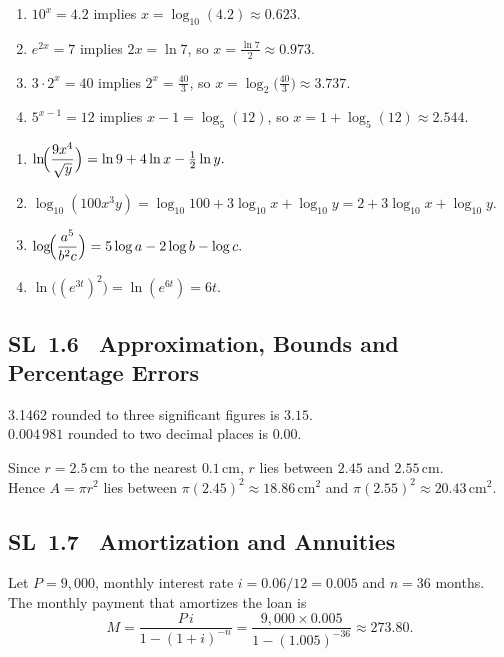 \documentclass[11pt]{article}
\newcommand{\tocsubsection}[1]{\subsection{#1}}
\begin{document}
\begin{solution}
\begin{enumerate}[label=(\alph*)]
\item $10^{x}=4.2$ implies $x=\log_{10}(4.2)\approx 0.623$.
\item $e^{2x}=7$ implies $2x=\ln 7$, so $x=\frac{\ln 7}{2}\approx 0.973$.
\item $3\cdot 2^x=40$ implies $2^x=\frac{40}{3}$, so $x=\log_{2}\!\bigl(\tfrac{40}{3}\bigr)\approx 3.737$.
\item $5^{x-1}=12$ implies $x-1=\log_{5}(12)$, so $x=1+\log_{5}(12)\approx 2.544$.
\end{enumerate}
\end{solution}

\begin{solution}
\begin{enumerate}[label=(\alph*)]
\item $\displaystyle \ln\!\Bigl(\frac{9x^4}{\sqrt{y}}\Bigr) = \ln 9 + 4\ln x - \tfrac{1}{2}\ln y.$
\item $\displaystyle \log_{10}(100x^3y) = \log_{10}100 + 3\log_{10}x + \log_{10}y = 2 + 3\log_{10}x + \log_{10}y.$
\item $\displaystyle \log\!\Bigl(\frac{a^5}{b^2 c}\Bigr) = 5\log a - 2\log b - \log c.$
\item $\displaystyle \ln\!\bigl((e^{3t})^2\bigr) = \ln(e^{6t}) = 6t.$
\end{enumerate}
\end{solution}

\tocsubsection{SL 1.6 \; Approximation, Bounds and Percentage Errors}

\begin{solution}
3.1462 rounded to three significant figures is $3.15$.  \\
$0.004\,981$ rounded to two decimal places is $0.00$.
\end{solution}

\begin{solution}
Since $r=2.5$\,cm to the nearest $0.1$\,cm, $r$ lies between $2.45$ and $2.55$\,cm.\\
Hence $A=\pi r^2$ lies between $\pi(2.45)^2\approx 18.86\,\text{cm}^2$ and $\pi(2.55)^2\approx 20.43\,\text{cm}^2$.
\end{solution}


\tocsubsection{SL 1.7 \; Amortization and Annuities}

\begin{solution}
Let $P=9{,}000$, monthly interest rate $i=0.06/12=0.005$ and $n=36$ months.\\
The monthly payment that amortizes the loan is 
\[
M = \frac{P\,i}{1 - (1+i)^{-n}} = \frac{9{,}000\times 0.005}{1 - (1.005)^{-36}} \approx 273.80.
\]
\end{solution}
\end{document}
